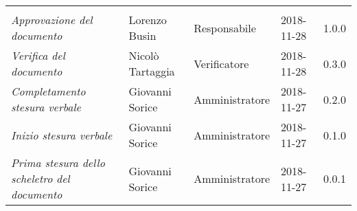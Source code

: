 \newpage 
\section*{}
\begin{table}[H]
	\centering
	\begin{tabular}{p{4cm}|C{3cm}|C{3cm}|R{2.5cm}|R{2cm}}
		
		 & & & & \\
		
		
		\emph{Approvazione del documento} & Lorenzo Busin & Responsabile & 2018-11-28 & 1.0.0 \\
		\hline
		
		\emph{Verifica del documento} & Nicolò Tartaggia & Verificatore & 2018-11-28 & 0.3.0 \\
		\hline

		\emph{Completamento stesura verbale} & Giovanni Sorice & Amministratore & 2018-11-27 & 0.2.0 \\
		\hline

		\emph{Inizio stesura verbale} & Giovanni Sorice & Amministratore & 2018-11-27 & 0.1.0 \\
		\hline
		
		\emph{Prima stesura dello scheletro del documento} & Giovanni Sorice & Amministratore & 2018-11-27 & 0.0.1 \\
		
	\end{tabular}
	
\end{table}


\clearpage
